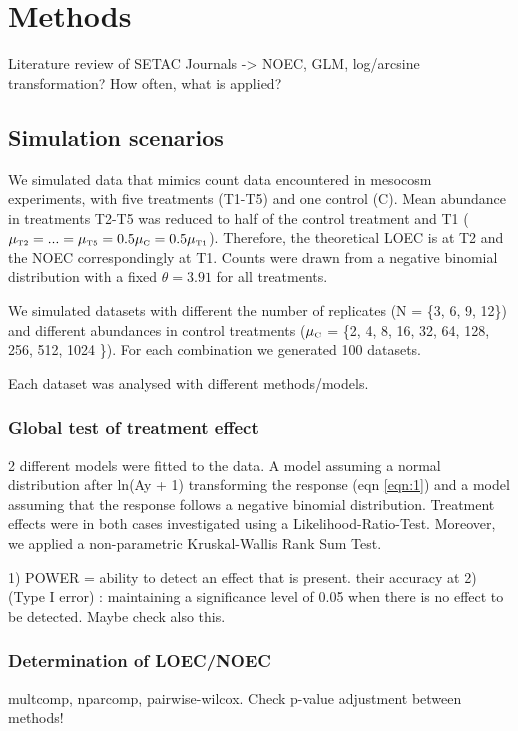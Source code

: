 \documentclass{scrartcl}\usepackage[]{graphicx}\usepackage[]{color}
\begin{document}
\section{Methods}

Literature review of SETAC Journals -> NOEC, GLM, log/arcsine transformation? How often, what is applied?



\subsection{Simulation scenarios}
We simulated data that mimics count data encountered in mesocosm experiments, with five treatments (T1-T5) and one control (C). 
Mean abundance in treatments T2-T5 was reduced to half of the control treatment and T1 ($\mu_\text{\tiny T2} = ... = \mu_\text{\tiny T5} = 0.5 \mu_\text{\tiny C} = 0.5 \mu_\text{\tiny T1} $). Therefore, the theoretical LOEC is at T2 and the NOEC correspondingly at T1.
Counts were drawn from a negative binomial distribution with a fixed $\theta = 3.91$ for all treatments.

We simulated datasets with different the number of replicates (N = \{3, 6, 9, 12\}) and different abundances in control treatments ($\mu_\text{\tiny C}$ = \{2, 4, 8, 16, 32, 64, 128, 256, 512, 1024 \}). For each combination we generated 100 datasets.

Each dataset was analysed with different methods/models.

\subsubsection{Global test of treatment effect}
2 different models were fitted to the data. 
A model assuming a normal distribution after ln(Ay + 1) transforming the response (eqn \ref{eqn:1}) and a model assuming that the response follows a negative binomial distribution.
Treatment effects were in both cases investigated using a Likelihood-Ratio-Test.
Moreover, we applied a non-parametric Kruskal-Wallis Rank Sum Test.

1) POWER = ability to detect an effect that is present.
their accuracy at
2) (Type I error) : maintaining a significance level of 0.05 when there is no
effect to be detected. Maybe check also this.

\subsubsection{Determination of LOEC/NOEC}
multcomp, nparcomp, pairwise-wilcox.
Check p-value adjustment between methods!
\end{document}
